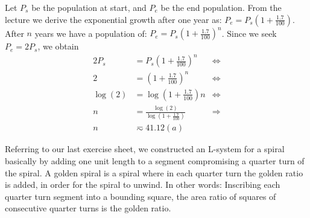 \documentclass[10pt,a4paper,boxed]{hmcpset}
\begin{document}
\begin{problem}[Assignment 31]
\end{problem}
\begin{solution}
Let $P_s$ be the population at start, and $P_e$ be the end population.
From the lecture we derive the exponential growth after one year as: $P_e = P_s \left( 1 + \frac{1.7}{100} \right)$.
After $n$ years we have a population of: $P_e = P_s \left( 1 + \frac{1.7}{100} \right)^n$. Since we seek $P_e = 2 P_s$, we obtain
\begin{align*}
	2 P_s & = P_s \left( 1 + \frac{1.7}{100} \right)^n & \Leftrightarrow \\
	2 & = \left( 1 + \frac{1.7}{100} \right)^n & \Leftrightarrow \\
	\log(2) & = \log \left( 1 + \frac{1.7}{100} \right) n & \Leftrightarrow \\
	n & = \frac{\log(2)}{\log \left( 1 + \frac{1.7}{100} \right)} & \Rightarrow \\
	n & \eqsim 41.12 (a)
\end{align*}
\end{solution}

\begin{problem}[Assignment 32]
\end{problem}
\begin{solution}
\end{solution}

\begin{problem}[Assignment 33]
\end{problem}
\begin{solution}
\end{solution}

\begin{problem}[Assignment 34]
\end{problem}
\begin{solution}
Referring to our last exercise sheet, we constructed an L-system for a spiral basically by adding one unit length to a segment compromising a quarter turn of the spiral. A golden spiral is a spiral where in each quarter turn the golden ratio is added, in order for the spiral to unwind. In other words: Inscribing each quarter turn segment into a bounding square, the area ratio of squares of consecutive quarter turns is the golden ratio.
\end{solution}
\end{document}
